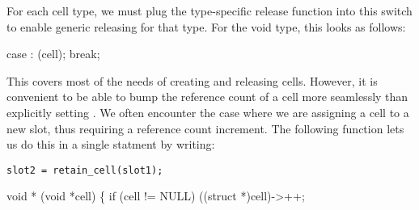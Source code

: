 \documentclass{article}%
\begin{document}
For each cell type, we must plug the type-specific release function
into this {\Tt{}\nwendquote} switch to enable generic releasing
for that type.
For the {\Tt{}void\nwendquote} type, this looks as follows:

\nwenddocs{}\endmoddef\nwstartdeflinemarkup{}\nwenddeflinemarkup
case :
        (cell);
        break;
\nwendcode{}\nwdocspar

This covers most of the needs of creating and releasing cells.
However, it is convenient to be able to bump the reference count
of a cell more seamlessly than explicitly setting {\Tt{}\nwendquote}.
We often encounter the case where we are assigning a cell
to a new slot,
thus requiring a reference count increment.
The following function {\Tt{}\nwendquote} lets us do this
in a single statment by writing:

\begin{verbatim}
slot2 = retain_cell(slot1);
\end{verbatim}

\nwenddocs{}\plusendmoddef\nwstartdeflinemarkup{}\nwenddeflinemarkup
{} void *
(void *cell)
\{
        if (cell != NULL)
                ((struct  *)cell)->++;
\end{document}
